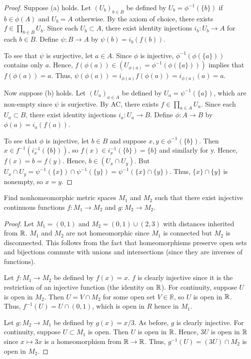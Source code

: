 \documentclass{article}
\begin{document}
\begin{proof}
Suppose (a) holds.  Let $(U_b)_{b \in B}$ be defined by $U_b = \phi^{-1}(\{b\})$ if $b \in \phi(A)$ and $U_b = A$ otherwise.  By the axiom of choice, there exists $f \in \prod_{b \in B} U_b$. Since each $U_b \subset A$, there exist identity injections $i_b:U_b \to A$ for each $b \in B$.  Define $\psi: B \to A$ by $\psi(b) = i_b(f(b))$.

To see that $\psi$ is surjective, let $a \in A$.  Since $\phi$ is injective, $\phi^{-1}(\phi(\{a\}))$ contains only $a$.  Hence, $f(\phi(a)) \in (U_{\phi(a)} = \phi^{-1}(\phi(\{a\})))$ implies that $f(\phi(a)) = a$. Thus, $\psi(\phi(a)) = i_{\phi(a)} f(\phi(a)) = i_{\phi(a)}(a) = a$.

Now suppose (b) holds. Let $(U_a)_{a \in A}$ be defined by $U_a = \psi^{-1}(\{a\})$, which are non-empty since $\psi$ is surjective.   By AC, there exists $f \in \prod_{a \in A} U_a$.  Since each $U_a \subset B$, there exist identity injections $i_a:U_a \to B$.  Define $\phi: A \to B$ by $\phi(a) = i_a(f(a))$.

To see that $\phi$ is injective, let $b \in B$ and suppose $x, y \in \phi^{-1}(\{b\})$. Then $x \in f^{-1}(i_x^{-1}(\{b\}))$, so $f(x) \in i_x^{-1}(\{b\}) = \{b\}$ and similarly for y.  Hence, $f(x) = b = f(y)$.  Hence, $b \in (U_x \cap U_y)$. But $U_x \cap U_y = \psi^{-1}(\{x\}) \cap \psi^{-1}(\{y\}) = \psi^{-1}(\{x\} \cap \{y\})$.  Thus, $\{x\} \cap \{y\}$ is nonempty, so $x = y$.

\end{proof}

 Find nonhomeomorphic metric spaces $M_1$ and $M_2$ such that there exist injective continuous functions $f:M_1 \to M_2$ and $g: M_2 \to M_2$.
\begin{proof}
Let $M_1 = (0,1)$ and $M_2 = (0,1) \cup (2,3)$ with distances inherited from $\mathbb{R}$.  $M_1$ and $M_2$ are not homeomorphic since $M_1$ is connected but $M_2$ is disconnected.  This follows from the fact that homeomorphisms preserve open sets and bijections commute with unions and intersections (since they are inverses of functions).

Let $f:M_1 \to M_2$ be defined by $f(x) = x$. $f$ is clearly injective since it is the restriction of an injective function (the identity on $\mathbb{R}$).  For continuity, suppose $U$ is open in $M_2$. Then $U = V \cap M_2$ for some open set $V \in \mathbb{R}$, so $U$ is open in $\mathbb{R}$. Thus, $f^{-1}(U) = U \cap (0,1)$, which is open in $R$ hence in $M_1$.

Let $g:M_2 \to M_1$ be defined by $g(x) = x/3$. As before, $g$ is clearly injective. For continuity, suppose $U \subset M_1$ is open.  Then $U$ is open in $\mathbb{R}$. Hence, $3U$ is open in $\mathbb{R}$ since $x \mapsto 3x$ is a homeomorphism from $\mathbb{R} \to \mathbb{R}$.  Thus, $g^{-1}(U) = (3U) \cap M_2$ is open in $M_2$.
\end{proof}
\end{document}
